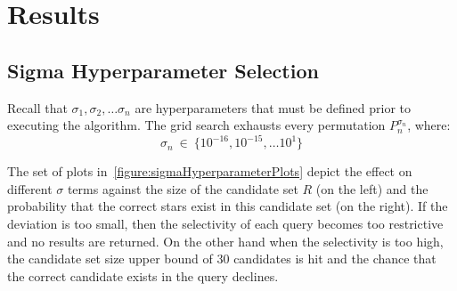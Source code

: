 \section{Results}\label{sec:results}

\subsection{Sigma Hyperparameter Selection}\label{subsec:sigmaHyperparameterSelectionResults}
Recall that $\sigma_1, \sigma_2, \ldots \sigma_n$ are hyperparameters that must be defined prior to executing the
algorithm.
The grid search exhausts every permutation $P_n^{\sigma_n}$, where:
\begin{equation}
    \label{eq:gridSearchQuerySigma}
    \sigma_n \ \in \ \{10^{-16}, 10^{-15}, \ldots 10^{1}\}
\end{equation}

\begin{figure}
\end{figure}

The set of plots in~\autoref{figure:sigmaHyperparameterPlots} depict the effect on different $\sigma$ terms against the
size of the candidate set $R$ (on the left) and the probability that the correct stars exist in this candidate set (on
the right).
If the deviation is too small, then the selectivity of each query becomes too restrictive and no results are returned.
On the other hand when the selectivity is too high, the candidate set size upper bound of 30 candidates is
hit and the chance that the correct candidate exists in the query declines.

